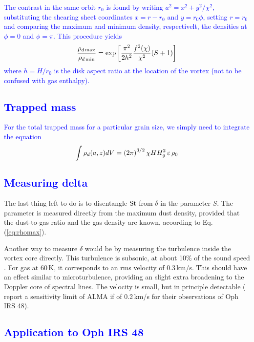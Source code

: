 \documentclass[apj]{emulateapj}
\def\blue#1{\textcolor{blue}{#1}}
\newcommand{\Eq}[1]{Eq. (\ref{#1})}
\newcommand{\eq}[1]{\Eq{#1}}
\newcommand{\beq}{\begin{equation}}
\newcommand{\eeq}{\end{equation}}
\newcommand{\St}{{\rm St}}
\begin{document}
\blue{The contrast in the same orbit $r_0$ is found by writing
  $a^2=x^2+y^2/\chi^2$, substituting the shearing sheet coordinates
  $x=r-r_0$ and $y=r_0 \phi$, setting $r=r_0$ and comparing the
  maximum and minimum density,  respectivelt, the densities at
  $\phi=0$ and $\phi=\pi$. This procedure yields
\beq
  \frac{\rho_{d\,{\rm max}}}{\rho_{d\,{\rm min}}} = \exp\left[\frac{\pi^2}{2h^2}\frac{f^2(\chi)}{\chi^2}(S+1)\right] 
\eeq 
\noindent where $h=H/r_0$ is the disk aspect ratio at the location of
the vortex (not to be confused with gas enthalpy).} 


\blue{\subsection{Trapped mass}}

\blue{For the total trapped mass for a particular grain size, we simply need
to integrate the equation 
\beq
\int\rho_d(a,z) dV  = \left(2\pi\right)^{3/2} \chi H H_g^2 \, \varepsilon \, \rho_0 \label{eq:int-dust}\\ 
\eeq
}

\subsection{\blue{Measuring delta}}

The last thing left to do is to disentangle $\St$ from $\delta$ in the
parameter $S$. The parameter is measured directly from the maximum dust density,
provided that the dust-to-gas ratio and the gas density are known, 
acoording to \eq{eq:rhomax}. 

Another way to measure $\delta$ would be by measuring the
turbulence inside the vortex core directly. This turbulence is
subsonic, at about 10\% of the sound speed \cite{LyraKlahr11}. For gas
at 60\,K, it corresponds to an rms velocity of 0.3\,km/s. This should
have an effect similar to microturbulence, providing an slight extra
broadening to the Doppler core of spectral lines. The velocity is
small, but in principle detectable (\cite{vanderMarel13} report a
sensitivity limit of ALMA if of 0.2\,km/s for their observations of
Oph IRS 48). 


\subsection{\blue{Application to Oph IRS 48}}

\end{document}
